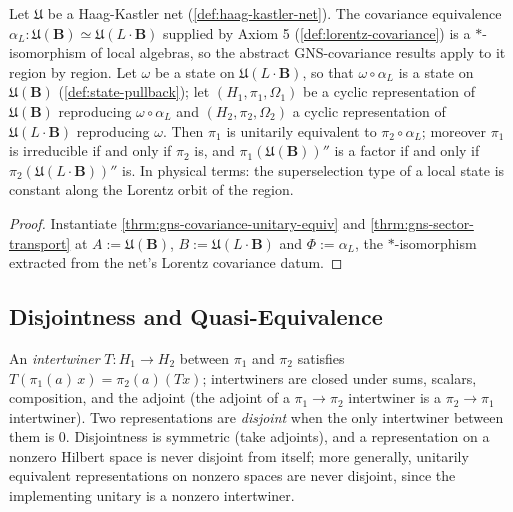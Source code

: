\begin{theorem}
    \label{thrm:gns-covariance-local}
    \leanok
    Let $\mathfrak{U}$ be a Haag-Kastler net (\ref{def:haag-kastler-net}). The covariance equivalence $\alpha_L : \mathfrak{U}(\mathbf{B}) \simeq \mathfrak{U}(L\cdot\mathbf{B})$ supplied by Axiom 5 (\ref{def:lorentz-covariance}) is a $*$-isomorphism of local algebras, so the abstract GNS-covariance results apply to it region by region. Let $\omega$ be a state on $\mathfrak{U}(L\cdot\mathbf{B})$, so that $\omega \circ \alpha_L$ is a state on $\mathfrak{U}(\mathbf{B})$ (\ref{def:state-pullback}); let $(H_1, \pi_1, \Omega_1)$ be a cyclic representation of $\mathfrak{U}(\mathbf{B})$ reproducing $\omega \circ \alpha_L$ and $(H_2, \pi_2, \Omega_2)$ a cyclic representation of $\mathfrak{U}(L\cdot\mathbf{B})$ reproducing $\omega$. Then $\pi_1$ is unitarily equivalent to $\pi_2 \circ \alpha_L$; moreover $\pi_1$ is irreducible if and only if $\pi_2$ is, and $\pi_1(\mathfrak{U}(\mathbf{B}))''$ is a factor if and only if $\pi_2(\mathfrak{U}(L\cdot\mathbf{B}))''$ is. In physical terms: the superselection type of a local state is constant along the Lorentz orbit of the region.
\end{theorem}
\begin{proof}
    \leanok
    Instantiate \ref{thrm:gns-covariance-unitary-equiv} and \ref{thrm:gns-sector-transport} at $A := \mathfrak{U}(\mathbf{B})$, $B := \mathfrak{U}(L\cdot\mathbf{B})$ and $\Phi := \alpha_L$, the $*$-isomorphism extracted from the net's Lorentz covariance datum.
\end{proof}

\subsection{Disjointness and Quasi-Equivalence}

\begin{definition}
    \label{def:disjoint-representations}
    \leanok
    An \emph{intertwiner} $T : H_1 \to H_2$ between $\pi_1$ and $\pi_2$ satisfies $T(\pi_1(a)\,x) = \pi_2(a)(T x)$; intertwiners are closed under sums, scalars, composition, and the adjoint (the adjoint of a $\pi_1 \to \pi_2$ intertwiner is a $\pi_2 \to \pi_1$ intertwiner). Two representations are \emph{disjoint} when the only intertwiner between them is $0$. Disjointness is symmetric (take adjoints), and a representation on a nonzero Hilbert space is never disjoint from itself; more generally, unitarily equivalent representations on nonzero spaces are never disjoint, since the implementing unitary is a nonzero intertwiner.
\end{definition}


